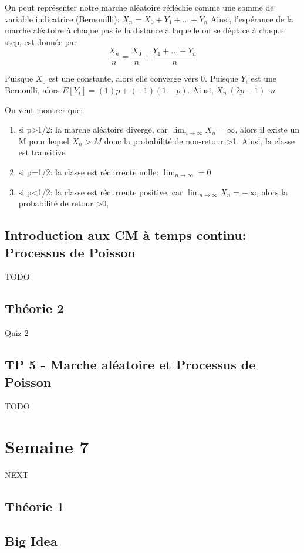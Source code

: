 \documentclass{article}
\begin{document}
On peut représenter notre marche aléatoire réfléchie comme une somme
de variable indicatrice (Bernouilli): $X_n = X_0 + Y_1 + ... + Y_n$
Ainsi, l'espérance de la marche aléatoire à chaque pas ie la distance
à laquelle on se déplace à chaque step, est donnée par
$$ \frac{X_n}{n} = \frac{X_0}{n} + \frac{Y_1 + ...+ Y_n}{n} $$

Puisque $X_0$ est une constante, alors elle converge vers 0. Puisque
$Y_i$ est une Bernoulli, alors $E[Y_i] = (1)p+(-1)(1-p)$. Ainsi,
$X_n ~ (2p-1) \cdot n$

On veut montrer que:
\begin{enumerate}
    \item si p>1/2: la marche aléatoire diverge, car
	$\lim_{n \to \infty} X_n = \infty $, alors il existe un M pour
	lequel $X_n>M$ donc la probabilité de non-retour >1. Ainsi,
	la classe est transitive
    \item si p=1/2: la classe est récurrente nulle:
	$ \lim_{n \to \infty} = 0 $
    \item si p<1/2: la classe est récurrente positive, car
	$\lim_{n \to \infty} X_n = -\infty $, alors la probabilité de
	retour >0,
\end{enumerate}

\subsection{Introduction aux CM à temps continu: Processus de Poisson}

TODO

\subsection{Théorie 2}

Quiz 2

\subsection{TP 5 - Marche aléatoire et Processus de Poisson}

TODO

\pagebreak
\section{Semaine 7}
NEXT
\subsection{Théorie 1}
\subsection*{Big Idea}
\end{document}
